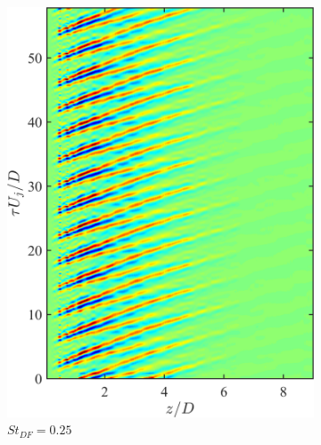 \begin{figure}
\begin{subfigure}{0.33\textwidth}
		\includegraphics[width=0.95\linewidth]{Figures/ch5_St025_modulated_source.png}
		\caption{$St_{DF} = 0.25$}
	\end{subfigure}%
	\begin{subfigure}{0.33\textwidth}
		\centering

\end{subfigure}
\end{figure}
